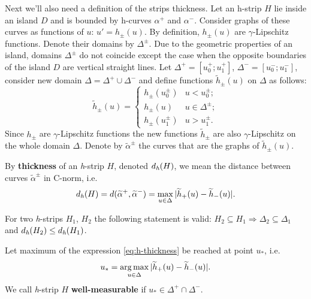 Next we'll also need a definition of the strips thickness.
Let an h-strip $H$ lie inside an island $D$ and is bounded by h-curves $\alpha^+$ and $\alpha^-$.
Consider graphs of these curves as functions of $u$: $u' = h_{\pm}(u)$.
By definition, $h_{\pm}(u)$ are $\gamma$-Lipschitz functions.
Denote their domains by $\Delta^{\pm}$.
Due to the geometric properties of an island, domains $\Delta^{\pm}$ do not coincide except the case when the opposite boundaries of the island $D$ are vertical straight lines.
Let $\Delta^+ = [u_0^+; u_1^+]$, $\Delta^- = [u_0^-; u_1^-]$, consider new domain $\Delta = \Delta^+ \cup \Delta^-$ and define functions $\widetilde{h}_{\pm}(u)$ on $\Delta$ as follows:
\begin{equation}
	\widetilde{h}_{\pm}(u) = \begin{cases}
		h_{\pm}(u_0^{\pm}) & u < u_0^{\pm}; \\
		h_{\pm}(u) & u \in \Delta^{\pm}; \\
		h_{\pm}(u_1^{\pm}) & u > u_1^{\pm}.
	\end{cases}
\label{eq:continuation}
\end{equation}
Since $h_{\pm}$ are $\gamma$-Lipschitz functions the new functions $\widetilde{h}_{\pm}$ are also $\gamma$-Lipschitz on the whole domain $\Delta$.
Denote by $\widetilde{\alpha}^{\pm}$ the curves that are the graphs of $\widetilde{h}_{\pm}(u)$.

\begin{definition}
\label{def:h-thickness}
	By {\bf thickness} of an \emph{h}-strip $H$, denoted $d_\emph{h}(H)$, we mean the distance between curves $\widetilde{\alpha}^{\pm}$ in C-norm, i.e.
	\begin{equation}
		d_\emph{h}(H) = d(\widetilde{\alpha}^+, \widetilde{\alpha}^-) = \max \limits_{u \in \Delta} |\widetilde{h}_+(u) - \widetilde{h}_-(u)|.
	\label{eq:h-thickness}
	\end{equation}
\end{definition}

\begin{remark}
\label{remark:h-strips-thickness}
	For two \emph{h}-strips $H_1$, $H_2$ the following statement is valid: $H_2 \subseteq H_1 \Rightarrow \Delta_2 \subseteq \Delta_1$ and $d_\emph{h}(H_2) \le d_\emph{h}(H_1)$.
\end{remark}

\begin{definition}
	Let maximum of the expression \eqref{eq:h-thickness} be reached at point $u_*$, i.e.
	\begin{equation}
		u_* = \operatorname*{arg\,max} \limits_{u \in \Delta} |\widetilde{h}_+(u) - \widetilde{h}_-(u)|.
	\label{eq:argmax}
	\end{equation}
	We call \emph{h}-strip $H$ {\bf well-measurable} if $u_* \in \Delta^+ \cap \Delta^-$.
\label{def:well-measurable-h-strip}
\end{definition}

